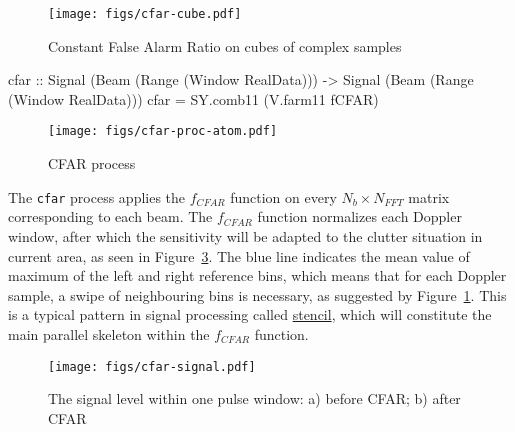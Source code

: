 \documentclass[
  a4paper,
]{article}
\newenvironment{Shaded}{}{}
\newcommand{\DataTypeTok}[1]{\textcolor[rgb]{0.56,0.13,0.00}{#1}}
\newcommand{\FunctionTok}[1]{\textcolor[rgb]{0.02,0.16,0.49}{#1}}
\newcommand{\NormalTok}[1]{#1}
\newcommand{\OtherTok}[1]{\textcolor[rgb]{0.00,0.44,0.13}{#1}}
\begin{document}
\begin{figure}
\hypertarget{fig:cube-cfar-cube}{%
\centering
\texttt{[image: figs/cfar-cube.pdf]}
\caption{Constant False Alarm Ratio on cubes of complex
samples}\label{fig:cube-cfar-cube}
}
\end{figure}

\begin{Shaded}
\begin{Highlighting}[numbers=left,,firstnumber=356,]
\OtherTok{cfar ::} \DataTypeTok{Signal}\NormalTok{ (}\DataTypeTok{Beam}\NormalTok{ (}\DataTypeTok{Range}\NormalTok{ (}\DataTypeTok{Window} \DataTypeTok{RealData}\NormalTok{)))}
     \OtherTok{->} \DataTypeTok{Signal}\NormalTok{ (}\DataTypeTok{Beam}\NormalTok{ (}\DataTypeTok{Range}\NormalTok{ (}\DataTypeTok{Window} \DataTypeTok{RealData}\NormalTok{)))}
\NormalTok{cfar }\FunctionTok{=}\NormalTok{ SY.comb11 (V.farm11 fCFAR)}
\end{Highlighting}
\end{Shaded}

\begin{figure}
\hypertarget{fig:cube-cfar-proc-atom}{%
\centering
\texttt{[image: figs/cfar-proc-atom.pdf]}
\caption{CFAR process}\label{fig:cube-cfar-proc-atom}
}
\end{figure}

The \texttt{cfar} process applies the \(f_{CFAR}\) function on every
\(N_b\times N_{FFT}\) matrix corresponding to each beam. The
\(f_{CFAR}\) function normalizes each Doppler window, after which the
sensitivity will be adapted to the clutter situation in current area, as
seen in Figure~\ref{fig:cube-cfar-signal}. The blue line indicates the
mean value of maximum of the left and right reference bins, which means
that for each Doppler sample, a swipe of neighbouring bins is necessary,
as suggested by Figure~\ref{fig:cube-cfar-cube}. This is a typical
pattern in signal processing called
\href{https://en.wikipedia.org/wiki/Stencil_code}{stencil}, which will
constitute the main parallel skeleton within the \(f_{CFAR}\) function.

\begin{figure}
\hypertarget{fig:cube-cfar-signal}{%
\centering
\texttt{[image: figs/cfar-signal.pdf]}
\caption{The signal level within one pulse window: a) before CFAR; b)
after CFAR}\label{fig:cube-cfar-signal}
}
\end{figure}
\end{document}
